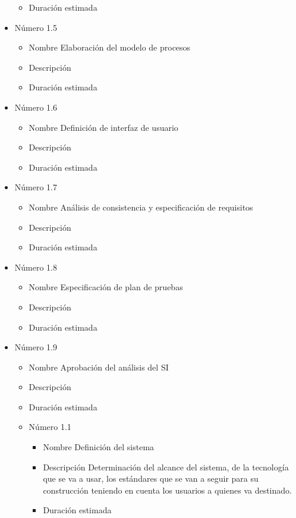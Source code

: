\documentclass[11pt,a4paper,spanish,twoside]{report}
\begin{document}
\begin{itemize}
\begin{itemize}
\item{Duración estimada} 
\end{itemize}
\item{Número} 1.5
\begin{itemize}
\item{Nombre} Elaboración del modelo de procesos
\item{Descripción}
\item{Duración estimada} 
\end{itemize}
\item{Número} 1.6
\begin{itemize}
\item{Nombre} Definición de interfaz de usuario
\item{Descripción}
\item{Duración estimada} 
\end{itemize}
\item{Número} 1.7
\begin{itemize}
\item{Nombre} Análisis de consistencia y especificación de requisitos
\item{Descripción}
\item{Duración estimada} 
\end{itemize}
\item{Número} 1.8
\begin{itemize}
\item{Nombre} Especificación de plan de pruebas
\item{Descripción}
\item{Duración estimada} 
\end{itemize}
\item{Número} 1.9
\begin{itemize}
\item{Nombre} Aprobación del análisis del SI
\item{Descripción}
\item{Duración estimada} 
\end{itemize}\begin{itemize}
\item{Número} 1.1
\begin{itemize}
\item{Nombre} Definición del sistema
\item{Descripción} Determinación del alcance del sistema, de la tecnología
  que se va a usar, los estándares que se van a seguir para su  construcción
  teniendo en cuenta los usuarios a quienes va destinado.
\item{Duración estimada} 

\end{itemize}
\end{itemize}
\end{itemize}
\end{document}
